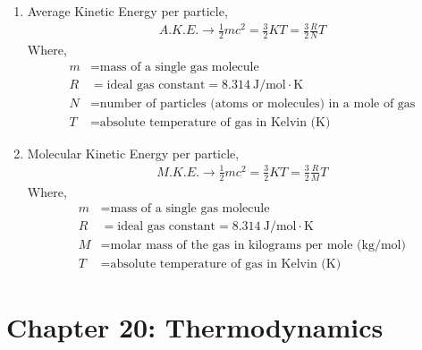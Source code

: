 \documentclass[12pt]{article}
\begin{document}
\begin{enumerate}[label=\roman*.]
	\item
		Average Kinetic Energy per particle,
		\[
		\begin{aligned}
			A.K.E. \rightarrow \frac{1}{2} mc^2 = \frac{3}{2}KT = \frac{3}{2}\frac{R}{N}T
		\end{aligned}
		\]
		Where,
		\begin{align*}
			m &= \text{mass of a single gas molecule} \\
			R &= \text{ideal gas constant} = 8.314 \ \text{J/mol} \cdot \text{K} \\
			N &= \text{number of particles (atoms or molecules) in a mole of gas} \\
			T &= \text{absolute temperature of gas in Kelvin (K)}
		\end{align*}

	\item
		Molecular Kinetic Energy per particle,
		\[
		\begin{aligned}
			M.K.E. \rightarrow \frac{1}{2} mc^2 = \frac{3}{2}KT = \frac{3}{2}\frac{R}{M}T
		\end{aligned}
		\]
		Where,
		\begin{align*}
			m &= \text{mass of a single gas molecule} \\
			R &= \text{ideal gas constant} = 8.314 \ \text{J/mol} \cdot \text{K} \\
			M &= \text{molar mass of the gas in kilograms per mole (kg/mol)} \\
			T &= \text{absolute temperature of gas in Kelvin (K)}
		\end{align*}
\end{enumerate}

\section{Chapter 20: Thermodynamics}
\end{document}
